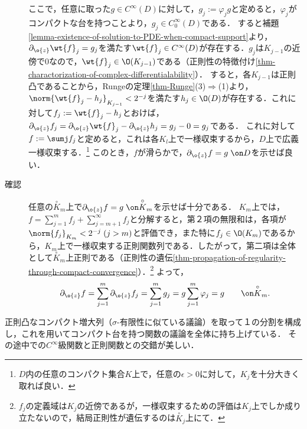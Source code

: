 \documentclass[uplatex, dvipdfmx]{jsreport}
\begin{document}
\begin{Proof}
\begin{description}
        ここで，任意に取った$g\in C^\infty(D)$に対して，$g_j:=\varphi_jg$と定めると，$\varphi_j$がコンパクトな台を持つことより，$g_j\in C_0^\infty(D)$である．
        すると補題\ref{lemma-existence-of-solution-to-PDE-when-compact-support}より，$\partial_{\o{z}}\wt{f}_j=g_j$を満たす$\wt{f}_j\in C^\infty(D)$が存在する．$g_j$は$K_{j-1}$の近傍で$0$なので，$\wt{f}_j\in\O(K_{j-1})$である（正則性の特徴付け\ref{thm-charactorization-of-complex-differentialability}）．
        すると，各$K_{j-1}$は正則凸であることから，Rungeの定理\ref{thm-Runge}(3)$\Rightarrow$(1)より，$\norm{\wt{f}_j-h_j}_{K_{j-1}}<2^{-j}$を満たす$h_j\in\O(D)$が存在する．これに対して$f_j:=\wt{f}_j-h_j$とおけば，$\partial_{\o{z}}f_j=\partial_{\o{z}}\wt{f}_j-\partial_{\o{z}}h_j=g_j-0=g_j$である．
        これに対して$f:=\sumj f_j$と定めると，これは各$K_l$上で一様収束するから，$D$上で広義一様収束する．\footnote{$D$内の任意のコンパクト集合$K$上で，任意の$\epsilon>0$に対して，$K_j$を十分大きく取れば良い．}
        このとき，$f$が滑らかで，$\partial_{\o{z}}f=g\;\on D$を示せば良い．
        \item[確認]
        任意の$\overset{\circ}{K}_m$上で$\partial_{\o{z}}f=g\;\on\overset{\circ}{K}_m$を示せば十分である．
        $K_m$上では，$f=\sum^m_{j=1}f_j+\sum_{j=m+1}^\infty f_j$と分解すると，第２項の無限和は，各項が$\norm{f_j}_{K_m}<2^{-j}\;(j>m)$と評価でき，また特に$f_j\in\O(K_m)$であるから，$K_m$上で一様収束する正則関数列である．したがって，第二項は全体として$\overset{\circ}{K}_m$上正則である（正則性の遺伝\ref{thm-propagation-of-regularity-through-compact-convergence}）．\footnote{$f_j$の定義域は$K_j$の近傍であるが，一様収束するための評価は$K_j$上でしか成り立たないので，結局正則性が遺伝するのは$\overset{\circ}{K}_j$上にて．}
        よって，\[\partial_{\o{z}}f=\sum^m_{j=1}\partial_{\o{z}}f_j=\sum^m_{j=1}g_j=g\sum^m_{j=1}\varphi_j=g\qquad\on\overset{\circ}{K}_m.\]
    \end{description}
\end{Proof}
\begin{remarks}
    正則凸なコンパクト増大列（$\sigma$-有限性に似ている議論）を取って１の分割を構成し，これを用いてコンパクト台を持つ関数の議論を全体に持ち上げている．
    その途中での$C^\infty$級関数と正則関数との交錯が美しい．
\end{remarks}
\end{document}
